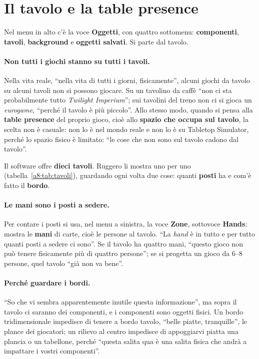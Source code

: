 \section{Il tavolo e la table presence}
\label{a8:sec:tavoli}

Nel menu in alto c'è la voce \textbf{Oggetti}, con quattro sottomenu:
\textbf{componenti}, \textbf{tavoli}, \textbf{background} e \textbf{oggetti
salvati}. Si parte dal tavolo.

\paragraph{Non tutti i giochi stanno su tutti i tavoli.} Nella vita reale, ``nella vita
di tutti i giorni, fisicamente'', alcuni giochi da tavolo su alcuni tavoli non si
possono giocare. Su un tavolino da caffè ``non ci sta probabilmente tutto
\emph{Twilight Imperium}''; sui tavolini del treno non ci si gioca un
\emph{eurogame}, ``perché il tavolo è più piccolo''. Allo stesso modo, quando si pensa
alla \textbf{table presence} del proprio gioco, cioè allo \textbf{spazio che occupa sul
tavolo}, la scelta non è casuale: non lo è nel mondo reale e non lo è su Tabletop
Simulator, perché lo spazio fisico è limitato: ``le cose che non sono sul tavolo
cadono dal tavolo''.

Il software offre \textbf{dieci tavoli}. Ruggero li mostra uno per uno
(tabella~\ref{a8:tab:tavoli}), guardando ogni volta due cose: quanti \textbf{posti}
ha e com'è fatto il \textbf{bordo}.

\paragraph{Le mani sono i posti a sedere.} Per contare i posti si usa, nel menu a
sinistra, la voce \textbf{Zone}, sottovoce \textbf{Hands}: mostra le \textbf{mani} di
carte, cioè le persone al tavolo. ``La \emph{hand} è in tutto e per tutto quanti
posti a sedere ci sono''. Se il tavolo ha quattro mani, ``questo gioco non può tenere
fisicamente più di quattro persone''; se si progetta un gioco da 6--8 persone, quel
tavolo ``già non va bene''.

\paragraph{Perché guardare i bordi.} ``So che vi sembra apparentemente inutile questa
informazione'', ma sopra il tavolo ci saranno dei componenti, e i componenti sono
oggetti fisici. Un bordo tridimensionale impedisce di tenere a bordo tavolo, ``belle
piatte, tranquille'', le plance dei giocatori; un rilievo al centro impedisce di
appoggiarvi piatta una plancia o un tabellone, perché ``questa salita qua è una
salita fisica che andrà a impattare i vostri componenti''.

